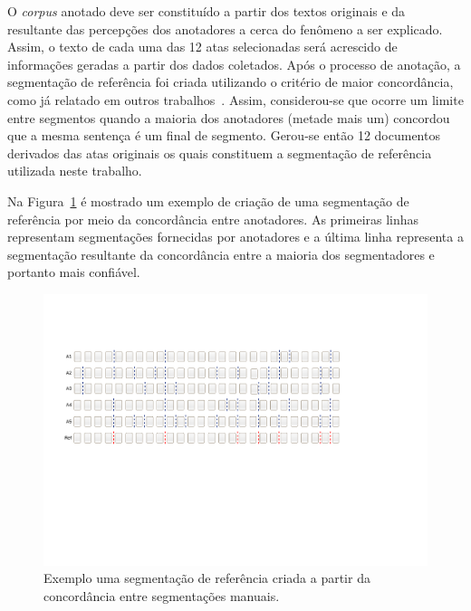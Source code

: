 O \textit{corpus} anotado deve ser constituído a partir dos textos originais e da resultante das percepções dos anotadores a cerca do fenômeno a ser explicado. Assim, o texto de cada uma das 12 atas selecionadas será acrescido de informações geradas a partir dos dados coletados. Após o processo de anotação, a segmentação de referência foi criada utilizando o critério de maior concordância, como já relatado em outros trabalhos~\cite{Hearst1997, Cardoso2017, Kazantseva2012, Passonneau1997, Galley2003}. Assim, considerou-se que ocorre um limite entre segmentos quando a maioria dos anotadores (metade mais um) concordou que a mesma sentença é um final de segmento. Gerou-se então 12 documentos derivados das atas originais os quais constituem a segmentação de referência utilizada neste trabalho.

Na Figura~\ref{fig:concordanciasegref} é mostrado um exemplo de criação de uma segmentação de referência por meio da concordância entre anotadores. As primeiras linhas representam segmentações fornecidas por anotadores e a última linha representa a segmentação resultante da concordância entre a maioria dos segmentadores e portanto mais confiável. 

  \begin{center}
	\begin{figure}[h!]

	\includegraphics[trim={ 45 255 190 120 },clip,page=1,width=\textwidth]{conteudo/capitulos/figs/segmentacao-referencia-2.pdf}

	\caption{Exemplo uma segmentação de referência criada a partir da concordância entre segmentações manuais.}
	\label{fig:concordanciasegref}
	\end{figure}
\end{center}







